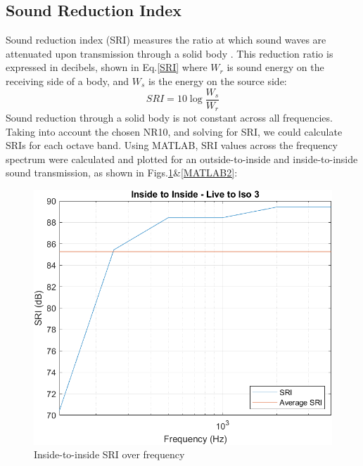 \documentclass[10pt, twocolumn]{article}
\begin{document}
        \subsection{Sound Reduction Index}
            Sound reduction index (SRI) measures the ratio at which sound waves are attenuated upon transmission through a solid body \cite{REDBOOK}.
            This reduction ratio is expressed in decibels, shown in Eq.\ref{SRI} where $W_r$ is sound energy on the receiving side of a body, and $W_s$ is the energy on the source side:
            \begin{equation}\label{SRI}
                SRI = 10\log{\frac{W_s}{W_r}}
            \end{equation}
            Sound reduction through a solid body is not constant across all frequencies.
            Taking into account the chosen NR10, and solving for SRI, we could calculate SRIs for each octave band.
            Using MATLAB, SRI values across the frequency spectrum were calculated and plotted for an outside-to-inside and inside-to-inside sound transmission, as shown in Figs.\ref{MATLAB1}\&\ref{MATLAB2}:
            \begin{figure}[H]
                \centering
                \includegraphics[scale = 0.6]{resources/I2ILive2Iso3.png}
                \caption{Inside-to-inside SRI over frequency}
                \label{MATLAB1}
            \end{figure}
\end{document}

